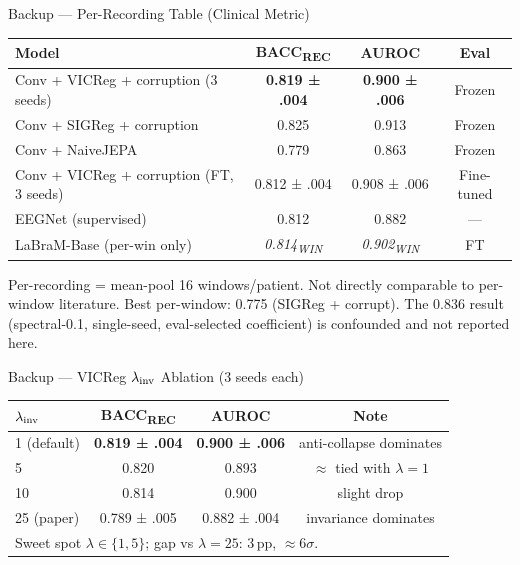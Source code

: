 \documentclass[aspectratio=169,10pt]{beamer}
\begin{document}
\begin{frame}{Backup — Per-Recording Table (Clinical Metric)}
\begin{tabular}{lccc}
\toprule
Model & BACC\textsubscript{REC} & AUROC & Eval \\
\midrule
Conv + VICReg + corruption (3 seeds) & \textbf{0.819 ± .004} & \textbf{0.900 ± .006} & Frozen \\
Conv + SIGReg + corruption & 0.825 & 0.913 & Frozen \\
Conv + NaiveJEPA & 0.779 & 0.863 & Frozen \\
Conv + VICReg + corruption (FT, 3 seeds) & 0.812 ± .004 & 0.908 ± .006 & Fine-tuned \\
EEGNet (supervised) & 0.812 & 0.882 & — \\
\midrule
LaBraM-Base (per-win only) & \textit{0.814\textsubscript{WIN}} & \textit{0.902\textsubscript{WIN}} & FT \\
\bottomrule
\end{tabular}

\vspace{0.5em}
\textcolor{muted}{\footnotesize Per-recording = mean-pool 16 windows/patient.
Not directly comparable to per-window literature. Best per-window: 0.775 (SIGReg + corrupt).
The 0.836 result (spectral-0.1, single-seed, eval-selected coefficient) is confounded and not reported here.}
\end{frame}

\begin{frame}{Backup — VICReg $\lambda_{\rm inv}$ Ablation (3 seeds each)}
\begin{tabular}{lccc}
\toprule
$\lambda_{\rm inv}$ & BACC\textsubscript{REC} & AUROC & Note \\
\midrule
1 (default) & \textbf{0.819 ± .004} & \textbf{0.900 ± .006} & anti-collapse dominates \\
5 & 0.820 & 0.893 & $\approx$ tied with $\lambda{=}1$ \\
10 & 0.814 & 0.900 & slight drop \\
25 (paper) & 0.789 ± .005 & 0.882 ± .004 & invariance dominates \\
\bottomrule
\multicolumn{4}{l}{\footnotesize Sweet spot $\lambda \in \{1,5\}$; gap vs $\lambda=25$: 3\,pp, $\approx$6$\sigma$.}
\end{tabular}
\end{frame}
\end{document}
